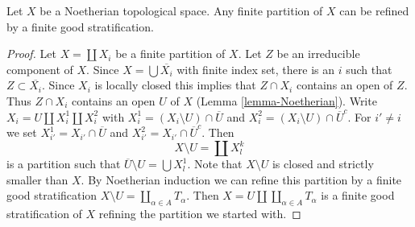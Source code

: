 \begin{lemma}
\label{lemma-noetherian-partition-refined-by-stratification}
Let $X$ be a Noetherian topological space. Any finite partition
of $X$ can be refined by a finite good stratification.
\end{lemma}

\begin{proof}
Let $X = \coprod X_i$ be a finite partition of $X$.
Let $Z$ be an irreducible component of $X$. Since $X = \bigcup \overline{X_i}$
with finite index set, there is an $i$ such that
$Z \subset \overline{X_i}$. Since $X_i$ is locally closed this
implies that $Z \cap X_i$ contains an open of $Z$. Thus
$Z \cap X_i$ contains an open $U$ of $X$ (Lemma \ref{lemma-Noetherian}).
Write $X_i = U \amalg X_i^1 \amalg X_i^2$ with
$X_i^1 = (X_i \setminus U) \cap \overline{U}$ and
$X_i^2 = (X_i \setminus U) \cap \overline{U}^c$.
For $i' \not = i$ we set
$X_{i'}^1 = X_{i'} \cap \overline{U}$ and
$X_{i'}^2 = X_{i'} \cap \overline{U}^c$.
Then
$$
X \setminus U = \coprod X^k_l
$$
is a partition such that $\overline{U} \setminus U = \bigcup X_l^1$.
Note that $X \setminus U$ is closed and strictly smaller than $X$.
By Noetherian induction we can refine this partition
by a finite good stratification
$X \setminus U = \coprod_{\alpha \in A} T_\alpha$.
Then $X = U \amalg \coprod_{\alpha \in A} T_\alpha$ is a finite
good stratification of $X$ refining the partition we started with.
\end{proof}





















